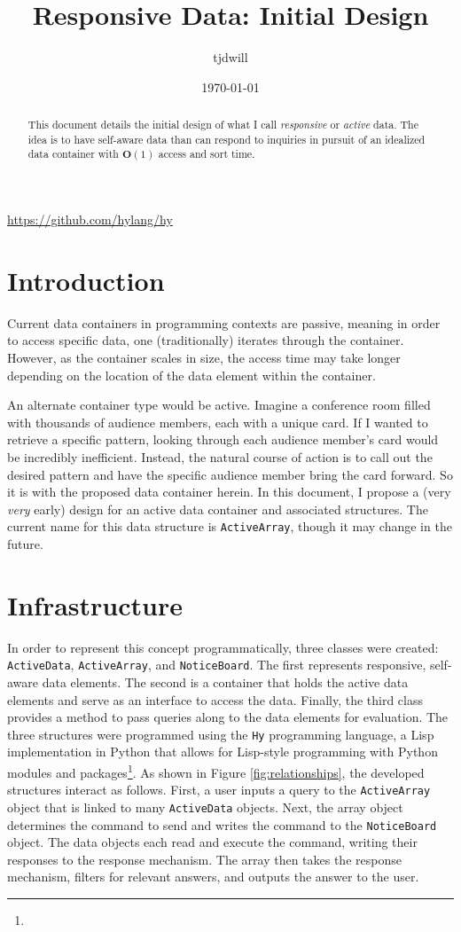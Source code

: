 \documentclass[10pt]{article}
\author{tjdwill}
\date{\today}
\title{Responsive Data: Initial Design}
\begin{document}
\maketitle

\urldef{\Hy}\url{https://github.com/hylang/hy}


\begin{abstract}
	This document details the initial design of what I call \textit{responsive} or \textit{active} data. The idea is to have self-aware data than can respond to inquiries in pursuit of an idealized data container with $\mathbf{O}(1)$ access and sort time.
\end{abstract}

\section{Introduction}
	Current data containers in programming contexts are passive, meaning in order to access specific data, one (traditionally) iterates through the container. However, as the container scales in size, the access time may take longer depending on the location of the data element within the container. 
	
	An alternate container type would be active. Imagine a conference room filled with thousands of audience members, each with a unique card. If I wanted to retrieve a specific pattern, looking through each audience member's card would be incredibly inefficient. Instead, the natural course of action is to call out the desired pattern and have the specific audience member bring the card forward. So it is with the proposed data container herein. In this document, I propose a (very \textit{very} early) design for an active data container and associated structures. The current name for this data structure is \lstinline|ActiveArray|, though it may change in the future.
	
\section{Infrastructure}

	In order to represent this concept programmatically, three classes were created:  \lstinline|ActiveData|, \lstinline|ActiveArray|, and \lstinline|NoticeBoard|. The first represents responsive, self-aware data elements. The second is a container that holds the active data elements and serve as an interface to access the data. Finally, the third class provides a method to pass queries along to the data elements for evaluation. The three structures were programmed using the \texttt{Hy} programming language, a Lisp implementation in Python that allows for Lisp-style programming with Python modules and packages\footnote{\Hy}. As shown in Figure \ref{fig:relationships}, the developed structures interact as follows. First, a user inputs a query to the \lstinline|ActiveArray| object that is linked to many \lstinline|ActiveData| objects. Next, the array object determines the command to send and writes the command to the \lstinline|NoticeBoard| object. The data objects each read and execute the command, writing their responses to the response mechanism. The array then takes the response mechanism, filters for relevant answers, and outputs the answer to the user.
	
\end{document}
